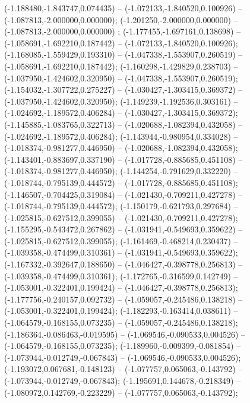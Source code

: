  (-1.188480,-1.843747,0.074435) -- (-1.072133,-1.840520,0.100926) -- (-1.087813,-2.000000,0.000000);
 (-1.201250,-2.000000,0.000000) -- (-1.087813,-2.000000,0.000000) ;
 (-1.177455,-1.697161,0.138698) -- (-1.058691,-1.692210,0.187442) -- (-1.072133,-1.840520,0.100926);
 (-1.168085,-1.559429,0.193310) -- (-1.047338,-1.553907,0.260519) -- (-1.058691,-1.692210,0.187442);
 (-1.160298,-1.429829,0.238703) -- (-1.037950,-1.424602,0.320950) -- (-1.047338,-1.553907,0.260519);
 (-1.154032,-1.307722,0.275227) -- (-1.030427,-1.303415,0.369372) -- (-1.037950,-1.424602,0.320950);
 (-1.149239,-1.192536,0.303161) -- (-1.024692,-1.189572,0.406284) -- (-1.030427,-1.303415,0.369372);
 (-1.145885,-1.083765,0.322713) -- (-1.020688,-1.082394,0.432058) -- (-1.024692,-1.189572,0.406284);
 (-1.143944,-0.980954,0.334028) -- (-1.018374,-0.981277,0.446950) -- (-1.020688,-1.082394,0.432058);
 (-1.143401,-0.883697,0.337190) -- (-1.017728,-0.885685,0.451108) -- (-1.018374,-0.981277,0.446950);
 (-1.144254,-0.791629,0.332220) -- (-1.018744,-0.795139,0.444572) -- (-1.017728,-0.885685,0.451108);
 (-1.146507,-0.704425,0.319084) -- (-1.021430,-0.709211,0.427278) -- (-1.018744,-0.795139,0.444572);
 (-1.150179,-0.621793,0.297684) -- (-1.025815,-0.627512,0.399055) -- (-1.021430,-0.709211,0.427278);
 (-1.155295,-0.543472,0.267862) -- (-1.031941,-0.549693,0.359622) -- (-1.025815,-0.627512,0.399055);
 (-1.161469,-0.468214,0.230437) -- (-1.039358,-0.474499,0.310361) -- (-1.031941,-0.549693,0.359622);
 (-1.167332,-0.392647,0.188650) -- (-1.046427,-0.398778,0.256813) -- (-1.039358,-0.474499,0.310361);
 (-1.172765,-0.316599,0.142749) -- (-1.053001,-0.322401,0.199424) -- (-1.046427,-0.398778,0.256813);
 (-1.177756,-0.240157,0.092732) -- (-1.059057,-0.245486,0.138218) -- (-1.053001,-0.322401,0.199424);
 (-1.182293,-0.163414,0.038611) -- (-1.064579,-0.168155,0.073235) -- (-1.059057,-0.245486,0.138218);
 (-1.186364,-0.086463,-0.019595) -- (-1.069546,-0.090533,0.004526) -- (-1.064579,-0.168155,0.073235);
 (-1.189960,-0.009399,-0.081854) -- (-1.073944,-0.012749,-0.067843) -- (-1.069546,-0.090533,0.004526);
 (-1.193072,0.067681,-0.148123) -- (-1.077757,0.065063,-0.143792) -- (-1.073944,-0.012749,-0.067843);
 (-1.195691,0.144678,-0.218349) -- (-1.080972,0.142769,-0.223229) -- (-1.077757,0.065063,-0.143792);
